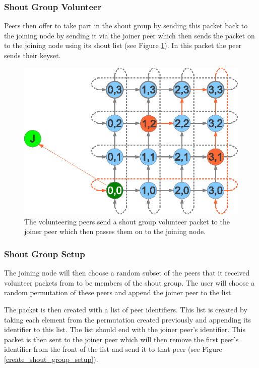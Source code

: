 \documentclass[ %
                    author={Luke Murray},
                supervisor={Dr. Simon Hollis},
                     title={Shadow Peer-to-Peer Networks},
                  subtitle={},
                    degree={MEng},
                      year={2013} ]{thesis}
\begin{document}
\subsubsection{Shout Group Volunteer}

Peers then offer to take part in the shout group by sending this packet back to the joining node by sending it via the joiner peer which then sends the packet on to the joining node using its shout list (see Figure \ref{create_shout_group_volunteer}). In this packet the peer sends their keyset. 

\begin{figure}[h]
    \centering
    \includegraphics{diagrams/create_shout_group_volunteer.eps}
    \caption{The volunteering peers send a shout group volunteer packet to the joiner peer which then passes them on to the joining node.}
    \label{create_shout_group_volunteer}
\end{figure}

\subsubsection{Shout Group Setup}

The joining node will then choose a random subset of the peers that it received volunteer packets from to be members of the shout group. The user will choose a random permutation of these peers and append the joiner peer to the list.

The packet is then created with a list of peer identifiers. This list is created by taking each element from the permutation created previously and appending its identifier to this list. The list should end with the joiner peer's identifier. This packet is then sent to the joiner peer which will then remove the first peer's identifier from the front of the list and send it to that peer (see Figure \ref{create_shout_group_setup}).
\end{document}
